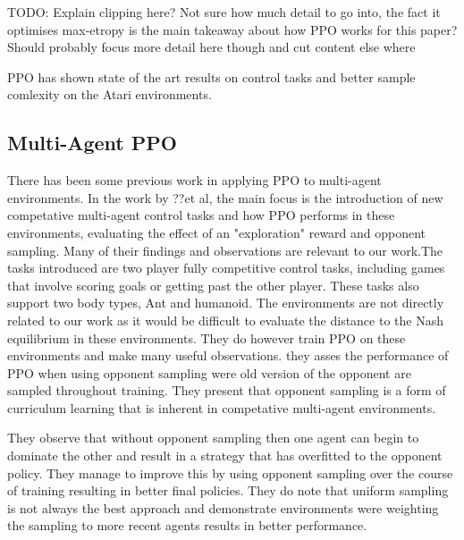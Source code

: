 \documentclass[conference]{IEEEtran}
\newcommand\TODO[1]{{\color{red}TODO: #1}}
\begin{document}

\TODO{Explain clipping here? Not sure how much detail to go into, the fact it optimises max-etropy is the main takeaway about how PPO works for this paper? Should probably focus more detail here though and cut content else where}

PPO has shown state of the art results on control tasks and better sample comlexity on the Atari environments.

\subsection{Multi-Agent PPO}

There has been some previous work in applying PPO to multi-agent environments. In the work by ??et al, the main focus is the introduction of new competative multi-agent control tasks and how PPO performs in these environments, evaluating the effect of an "exploration" reward and opponent sampling. Many of their findings and observations are relevant to our work.The tasks introduced are two player fully competitive control tasks, including games that involve scoring goals or getting past the other player. These tasks also support two body types, Ant and humanoid. The environments are not directly related to our work as it would be difficult to evaluate the distance to the Nash equilibrium in these environments. They do however train PPO on these environments and make many useful observations. they asses the performance of PPO when using opponent sampling were old version of the opponent are sampled throughout training. They present that opponent sampling is a form of curriculum learning that is inherent in competative multi-agent environments.

They observe that without opponent sampling then one agent can begin to dominate the other and result in a strategy that has overfitted to the opponent policy. They manage to improve this by using opponent sampling over the course of training resulting in better final policies. They do note that uniform sampling is not always the best approach and demonstrate environments were weighting the sampling to more recent agents results in better performance.
\end{document}
